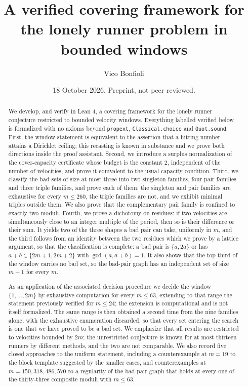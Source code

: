 \documentclass[11pt]{amsart}
\theoremstyle{plain}
\theoremstyle{definition}
\begin{document}
\title[A verified covering framework for the lonely runner problem]
{A verified covering framework for the lonely runner problem in bounded windows}

\author{Vico Bonfioli}

\date{18 October 2026. Preprint, not peer reviewed.}

\begin{abstract}
We develop, and verify in Lean 4, a covering framework for the lonely runner conjecture restricted
to bounded velocity windows. Everything labelled verified below is formalized with no axioms beyond
\texttt{propext}, \texttt{Classical.choice} and \texttt{Quot.sound}. First, the window statement is
equivalent to the assertion that a hitting number attains a Dirichlet ceiling; this recasting is
known in substance and we prove both directions inside the proof assistant. Second, we introduce a
surplus normalization of the cover-capacity certificate whose budget is the constant $2$,
independent of the number of velocities, and prove it equivalent to the usual capacity condition.
Third, we classify the bad sets of size at most three into two singleton families, four pair
families and three triple families, and prove each of them; the singleton and pair families are
exhaustive for every $m \le 260$, the triple families are not, and we exhibit minimal triples
outside them. We also prove that the complementary pair family is confined to exactly two moduli.
Fourth, we prove a dichotomy on residues: if two velocities are simultaneously close to an integer
multiple of the period, then so is their difference or their sum. It yields two of the three shapes
a bad pair can take, uniformly in $m$, and the third follows from an identity between the two
residues which we prove by a lattice argument, so that the classification is complete: a bad pair is
$\{a,2a\}$ or has $a+b \in \{2m+1,2m+2\}$ with $\gcd(a,a+b)=1$. It also shows that the top
third of the window carries no bad set, so the bad-pair graph has an independent set of size $m-1$
for every $m$.

As an application of the associated decision procedure we decide the window $\{1,\dots,2m\}$ by
exhaustive computation for every $m \le 63$, extending to that range the statement previously
verified for $m \le 24$; the extension is computational and is not itself formalized. The same range
is then obtained a second time from the nine families alone, with the exhaustive enumeration
discarded, so that every set entering the search is one that we have proved to be a bad set. We
emphasize that all results are restricted to velocities bounded by $2m$; the unrestricted conjecture
is known for at most thirteen runners by different methods, and the two are not comparable. We also
record five closed approaches to the uniform statement, including a counterexample at $m = 19$ to
the block template suggested by the smaller cases, and counterexamples at $m = 150, 318, 486, 570$
to a regularity of the bad-pair graph that holds at every one of the thirty-three composite moduli
with $m \le 63$.
\end{abstract}
\end{document}
